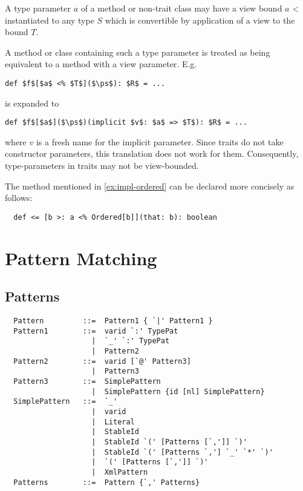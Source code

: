 A type parameter $a$ of a method or non-trait class may have a view bound
\lstinline@$a$ <% $T$@. In this case the type parameter may be
instantiated to any type $S$ which is convertible by application of a
view to the bound $T$.

A method or class containing such a type parameter is treated as being
equivalent to a
method with a view parameter. E.g.
\begin{lstlisting}
def $f$[$a$ <% $T$]($\ps$): $R$ = ...
\end{lstlisting}
is expanded to 
\begin{lstlisting}
def $f$[$a$]($\ps$)(implicit $v$: $a$ => $T$): $R$ = ...
\end{lstlisting}
where $v$ is a fresh name for the implicit parameter.
Since traits do not take constructor parameters, this translation does not work for them.
Consequently, type-parameters in traits may not be view-bounded.

\example The \code{<=} method mentioned in \ref{ex:impl-ordered} can be declared
more concisely as follows:
\begin{lstlisting}
  def <= [b >: a <% Ordered[b]](that: b): boolean
\end{lstlisting}

\chapter{Pattern Matching}

\section{Patterns}

\label{sec:patterns}

\syntax\begin{lstlisting}
  Pattern         ::=  Pattern1 { `|' Pattern1 }
  Pattern1        ::=  varid `:' TypePat
                    |  `_' `:' TypePat
                    |  Pattern2
  Pattern2        ::=  varid [`@' Pattern3]
                    |  Pattern3
  Pattern3        ::=  SimplePattern 
                    |  SimplePattern {id [nl] SimplePattern}
  SimplePattern   ::=  `_'
                    |  varid
                    |  Literal
                    |  StableId
                    |  StableId `(' [Patterns [`,']] `)'
                    |  StableId `(' [Patterns `,'] `_' `*' `)'
                    |  `(' [Patterns [`,']] `)'
                    |  XmlPattern
  Patterns        ::=  Pattern {`,' Patterns}
\end{lstlisting}

